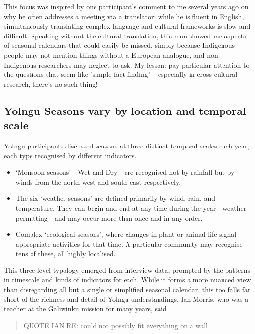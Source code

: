 This focus was inspired by one participant's
comment to me several years ago on why he often addresses a meeting via a
translator: while he is fluent in English, simultaneously translating complex
language and cultural frameworks is slow and difficult.
%
Speaking without the cultural translation, this man showed me aspects of
seasonal calendars that could easily be missed, simply because Indigenous
people may not mention things without a European analogue, and non-Indigenous
researchers may neglect to ask.  My lesson: pay particular attention to the
questions that seem like `simple fact-finding' -- especially in cross-cultural
research, there's no such thing!\\






\subsection{Yolngu Seasons vary by location and temporal scale}
\label{subsec:three-seasons-scales}

Yolngu participants discussed seasons at three distinct temporal scales
each year, each type recognised by different indicators.
\begin{itemize}
\item `Monsoon seasons' - Wet and Dry - are recognised not by rainfall but
        by winds from the north-west and south-east respectively.
\item The six `weather seasons' are defined primarily by wind, rain, and temperature.
        They can begin and end at any time during the year - weather permitting -
        and may occur more than once and in any order.
\item Complex `ecological seasons', where changes in plant or animal life
        signal appropriate activities for that time.  A particular community
        may recognise tens of these, all highly localised.
\end{itemize}

This three-level typology emerged from interview data, prompted by
the patterns in timescale and kinds of indicators for each.
While it forms a more nuanced view than disregarding all but a single or
simplified seasonal calendar, this too falls far short of the richness
and detail of Yolngu understandings.
%
Ian Morris, who was a teacher at the Galiwinku mission for many years,
said \blockquote{
    QUOTE IAN RE: could not possibly fit everything on a wall
}

